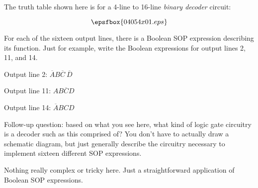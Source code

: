 

The truth table shown here is for a 4-line to 16-line {\it binary decoder} circuit:

$$\epsfbox{04054x01.eps}$$

For each of the sixteen output lines, there is a Boolean SOP expression describing its function.  Just for example, write the Boolean expressions for output lines 2, 11, and 14.







Output line 2: $\overline{A}B \overline{C} \> \overline{D}$

Output line 11: $A B \overline{C} D$

Output line 14: $\overline{A} B C D$

\vskip 10pt

Follow-up question: based on what you see here, what kind of logic gate circuitry is a decoder such as this comprised of?  You don't have to actually draw a schematic diagram, but just generally describe the circuitry necessary to implement sixteen different SOP expressions.







Nothing really complex or tricky here.  Just a straightforward application of Boolean SOP expressions.




